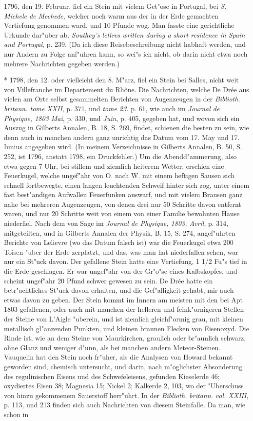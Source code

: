 \documentclass[a4paper, 11pt, oneside, polutonikogreek, german]{article}
\begin{document}
1796, den 19. Februar, fiel ein Stein mit vielem Get"ose in Portugal, bei \emph{S. Michele de Mechede}, welcher noch warm aus der in der Erde gemachten Vertiefung genommen ward, und 10 Pfunde wog. Man fasste eine gerichtliche Urkunde dar"uber ab. \emph{Southey's lettres written during a short residence in Spain and Portugal}, p. 239. (Da ich diese Reisebeschreibung nicht habhaft werden, und nur Andern zu Folge anf"uhren kann, so wei"s ich nicht, ob darin nicht etwa noch mehrere Nachrichten gegeben werden.)

* 1798, den 12. oder vielleicht den 8. M"arz, fiel ein Stein bei Salles, nicht weit von Villefranche im Departement du Rhône. Die Nachrichten, welche De Drée aus vielen am Orte selbst gesammelten Berichten von Augenzeugen in der \emph{Biblioth. britann. tome XXII}, p. 371, und \emph{tome 23.} p. 61, wie auch im \emph{Journal de Physique, 1803 Mai}, p. 330, und \emph{Juin}, p. 405, gegeben hat, und wovon sich ein Auszug in Gilberts Annalen, B. 18, S. 269, findet, schienen die besten zu sein, wie denn auch in manchen andern ganz unrichtig das Datum vom 17. May und 17. Iunius angegeben wird. (In meinem Verzeichnisse in Gilberts Annalen, B. 50, S. 252, ist 1796, anstatt 1798, ein Druckfehler.) Um die Abendd"ammerung, also etwa gegen 7 Uhr, bei stillem und ziemlich heiterem Wetter, erschien eine Feuerkugel, welche ungef"ahr von O. nach W. mit einem heftigen Sausen sich schnell fortbewegte, einen langen leuchtenden Schweif hinter sich zog, unter einem fast best"andigen Aufwallen Feuerfunken auswarf, und mit vielem Brausen ganz nahe bei mehreren Augenzeugen, von denen drei nur 50 Schritte davon entfernt waren, und nur 20 Schritte weit von einem von einer Familie bewohnten Hause niederfiel. Nach dem von Sage im \emph{Journal de Physique, 1803, Avril}, p. 314, mitgeteilten, und in Gilberts Annalen der Physik, B. 15, S. 274, angef"uhrten Berichte von Lelievre (wo das Datum falsch ist) war die Feuerkugel etwa 200 Toisen "uber der Erde zerplatzt, und das, was man hat niederfallen sehen, war nur ein St"uck davon. Der gefallene Stein hatte eine Vertiefung, 1 1/2 Fu"s tief in die Erde geschlagen. Er war ungef"ahr von der Gr"o"se eines Kalbskopfes, und scheint ungef"ahr 20 Pfund schwer gewesen zu sein. De Drée hatte ein betr"achtliches St"uck davon erhalten, und die Gef"alligkeit gehabt, mir auch etwas davon zu geben. Der Stein kommt im Innern am meisten mit den bei Apt 1803 gefallenen, oder auch mit manchen der helleren und feink"ornigeren Stellen der Steine von L'Aigle "uberein, und ist ziemlich gleichf"ormig grau, mit kleinen metallisch gl"anzenden Punkten, und kleinen braunen Flecken von Eisenoxyd. Die Rinde ist, wie an dem Steine von Maurkirchen, graulich oder br"aunlich schwarz, ohne Glanz und weniger d"unn, als bei manchen andern Meteor-Steinen. Vauquelin hat den Stein noch fr"uher, als die Analysen von Howard bekannt geworden sind, chemisch untersucht, und darin, nach m"oglichster Absonderung des regulinischen Eisens und des Schwefeleisens, gefunden Kieselerde 46; oxydiertes Eisen 38; Magnesia 15; Nickel 2; Kalkerde 2, 103, wo der "Uberschuss von hinzu gekommenem Sauerstoff herr"uhrt. In der \emph{Biblioth. britann. vol. XXIII}, p. 113, und 213 finden sich auch Nachrichten von diesem Steinfalle. Da man, wie schon in 
\end{document}

